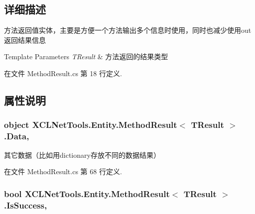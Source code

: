 \subsection{详细描述}
方法返回值实体，主要是方便一个方法输出多个信息时使用，同时也减少使用out返回结果信息 


\begin{DoxyTemplParams}{Template Parameters}
{\em T\-Result} & 方法返回的结果类型\\
\hline
\end{DoxyTemplParams}


在文件 Method\-Result.\-cs 第 18 行定义.



\subsection{属性说明}
\hypertarget{class_x_c_l_net_tools_1_1_entity_1_1_method_result_3_01_t_result_01_4_ab97c4a1207c6a61651647dad225189b0}{
\subsubsection[{Data}]{\setlength{\rightskip}{0pt plus 5cm}object X\-C\-L\-Net\-Tools.\-Entity.\-Method\-Result$<$ T\-Result $>$.Data\hspace{0.3cm}{\ttfamily [get]}, {\ttfamily [set]}}}\label{class_x_c_l_net_tools_1_1_entity_1_1_method_result_3_01_t_result_01_4_ab97c4a1207c6a61651647dad225189b0}


其它数据（比如用dictionary存放不同的数据结果） 



在文件 Method\-Result.\-cs 第 68 行定义.

\hypertarget{class_x_c_l_net_tools_1_1_entity_1_1_method_result_3_01_t_result_01_4_a23c741c9a35f609e2bb5b8842911a48e}{
\subsubsection[{Is\-Success}]{\setlength{\rightskip}{0pt plus 5cm}bool X\-C\-L\-Net\-Tools.\-Entity.\-Method\-Result$<$ T\-Result $>$.Is\-Success\hspace{0.3cm}{\ttfamily [get]}, {\ttfamily [set]}}}\label{class_x_c_l_net_tools_1_1_entity_1_1_method_result_3_01_t_result_01_4_a23c741c9a35f609e2bb5b8842911a48e}


